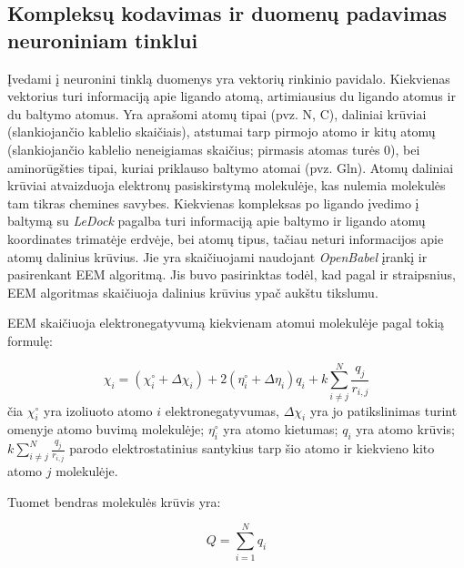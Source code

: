 
\subsection{Kompleksų kodavimas ir duomenų padavimas neuroniniam tinklui}

Įvedami į neuronini tinklą duomenys yra vektorių rinkinio pavidalo. Kiekvienas vektorius turi informaciją apie ligando atomą, artimiausius du ligando atomus ir du baltymo atomus. Yra aprašomi atomų tipai (pvz. N, C), daliniai krūviai (slankiojančio kablelio skaičiais), atstumai tarp pirmojo atomo ir kitų atomų (slankiojančio kablelio neneigiamas skaičius; pirmasis atomas turės 0), bei aminorūgšties tipai, kuriai priklauso baltymo atomai (pvz. Gln). Atomų daliniai krūviai atvaizduoja elektronų pasiskirstymą molekulėje, kas nulemia molekulės tam tikras chemines savybes.
Kiekvienas kompleksas po ligando įvedimo į baltymą su \emph{LeDock} pagalba turi informaciją apie baltymo ir ligando atomų koordinates trimatėje erdvėje, bei atomų tipus, tačiau neturi informacijos apie atomų dalinius krūvius. Jie yra skaičiuojami naudojant \emph{OpenBabel} įrankį ir pasirenkant EEM algoritmą. %
Jis buvo pasirinktas todėl, kad pagal \cite{} ir \cite{} straipsnius, EEM algoritmas skaičiuoja dalinius krūvius ypač aukštu tikslumu.

EEM skaičiuoja elektronegatyvumą kiekvienam atomui molekulėje pagal tokią formulę: %

\begin{equation}
\chi_{i}=\left(\chi_{i}^{\circ}+\Delta \chi_{i}\right)+2\left(\eta_{i}^{\circ}+\Delta \eta_{i}\right) q_{i}+k \sum_{i \neq j}^{N} \frac{q_{j}}{r_{i, j}}
\end{equation}
čia $\chi_{i}^{\circ}$ yra izoliuoto atomo $i$ elektronegatyvumas, $\Delta \chi_{i}$ yra jo patikslinimas turint omenyje atomo buvimą molekulėje; $\eta_{i}^{\circ}$ yra atomo kietumas; $q_{i}$ yra atomo krūvis; $k \sum_{i \neq j}^{N} \frac{q_{j}}{r_{i, j}}$ parodo elektrostatinius santykius tarp šio atomo ir kiekvieno kito atomo $j$ molekulėje.

Tuomet bendras molekulės krūvis yra: 

\begin{equation}
Q=\sum_{i=1}^{N} q_{i}
\end{equation}



